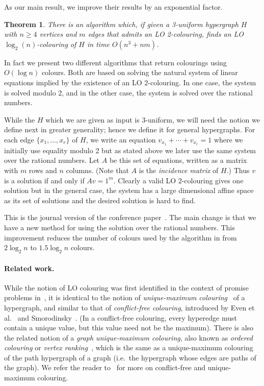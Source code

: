 \documentclass[a4paper,11pt]{article}
\theoremstyle{plain}
\newtheorem{theorem}{Theorem}
\theoremstyle{definition}
\begin{document}
As our main result, we improve their results by an exponential factor. 

\begin{theorem}\label{thm:main}
    There is an algorithm which, if given a 3-uniform hypergraph $H$ with $n \geq 4$ vertices
    and $m$ edges that admits an LO 2-colouring, finds an LO
    $\log_2(n)$-colouring of $H$ in time $O(n^3 + nm)$.
\end{theorem}

In fact we present two different algorithms that return colourings using $O(\log n)$ colours.  Both 
are based on solving the natural system of linear equations implied by the existence of an LO 2-colouring.  In one case, the system is solved modulo 2, and in the other case, the system is solved over the rational numbers.

While the $H$ which we are given as input is 3-uniform, we will need the notion we define next in greater generality; hence we define it for general hypergraphs. For each edge $\{x_1, \ldots, x_r\}$ of $H$, we write an equation $v_{x_1} + \cdots + v_{x_r} = 1$ where we initially use equality modulo 2 but as stated above we later use the same
system over the rational numbers.   Let $A$ be this set of equations, written as a matrix with $m$
    rows and $n$ columns. (Note that $A$ is the \emph{incidence matrix} of $H$.) Thus $v$ is a solution if and only if
    $Av=1^m$.  Clearly a valid LO 2-colouring gives one solution but in the general case, the system 
    has a large dimensional affine space as its set of solutions and the 
    desired solution is hard to find.

    This is the journal version of the conference paper~\cite{HMNZ24:approx}. The main change is that we have a new method for using the solution over the rational numbers. This improvement reduces the number of colours used by the algorithm in  from $2 \log_2 n$ to $1.5 \log_2 n$ colours.

\paragraph{Related work.} While the notion of LO colouring was first identified in the context of promise problems in~\cite{Barto21:stacs}, it is identical to the notion of \emph{unique-maximum colouring}~\cite{Cheilaris13:sidma} of a hypergraph, and similar to that of \emph{conflict-free colouring}, introduced by Even et al.~\cite{Even02} and Smorodinsky~\cite{smorodinskythesis}. (In a conflict-free colouring, every hyperedge must contain a unique value, but this value need not be the maximum). There is also the related notion of a \emph{graph unique-maximum colouring}, also known as \emph{ordered colouring} or \emph{vertex ranking}~\cite{Cheilaris11:jda}, which is the same as a unique-maximum colouring of the path hypergraph of a graph (i.e.~the hypergraph whose edges are paths of the graph). We refer the reader to~\cite{Smorodinsky2013} for more on conflict-free and unique-maximum colouring.
\end{document}
